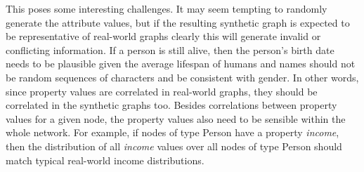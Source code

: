 This poses some interesting challenges. It may seem tempting to randomly generate the attribute values, but if the resulting synthetic graph is expected to be representative of real-world graphs clearly this will generate invalid or conflicting information. If a person is still alive, then the person's birth date needs to be plausible given the average lifespan of humans and names should not be random sequences of characters and be consistent with gender.
In other words, since property values are correlated in real-world graphs, they should be correlated in the synthetic graphs too. Besides correlations between property values for a given node, the property values also need to be sensible within the whole network. For example, if nodes of type Person have a property \textit{income}, then the distribution of all \textit{income} values over all nodes of type Person should match typical real-world income distributions.